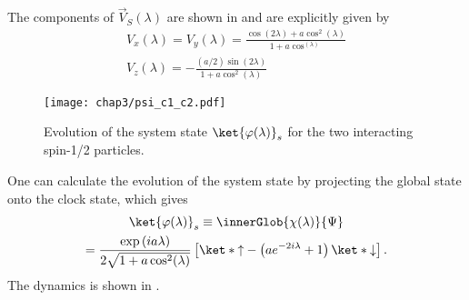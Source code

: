 The components of \(\vec{V}_S(\lambda)\) are shown in  and 
are explicitly given by 
\begin{equation}
    \begin{gathered}
        V_x(\lambda) = V_y(\lambda) = \frac{\cos(2\lambda) + a \cos^2(\lambda)}{1 + a\cos^(\lambda)}\\
        V_z(\lambda) = -\frac{(a/2)\sin(2\lambda)}{1 + a \cos^2(\lambda)}
    \end{gathered}
\end{equation}
\begin{figure}[!h]
    \centering
    \texttt{[image: chap3/psi\_c1\_c2.pdf]}
    \caption{Evolution of the system state \(\ket{\varphi(\lambda)}_s\) for the two interacting spin-1/2 particles. }
    \label{fig:2spin_interact_RQM}
\end{figure}


One can calculate the evolution of the system state by projecting the global state onto the clock state,
which gives
\begin{equation}
    \begin{gathered}
        \ket{\varphi(\lambda)}_s \equiv  \innerGlob{\chi(\lambda)}{\Psi} \\
        = \frac{\exp\left(i a\lambda\right)}{
            2\sqrt{1 + a \cos^2(\lambda)}} \left[\ket*{\uparrow} - 
            \left(a e^{-2i\lambda} + 1\right)\ket*{\downarrow}\right] .
    \end{gathered}
\end{equation}
The dynamics is shown in .



\newpage